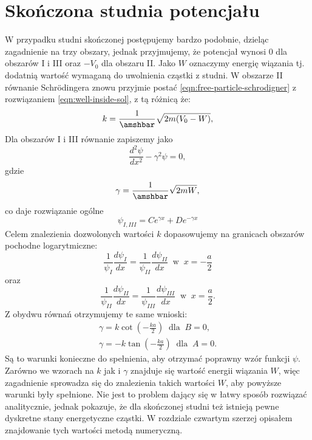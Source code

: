 \documentclass{SGGW-thesis}
\begin{document}
	\section{Skończona studnia potencjału}
	W przypadku studni skończonej postępujemy bardzo podobnie, dzieląc zagadnienie na trzy obszary, jednak przyjmujemy, że potencjał wynosi 0 dla obszarów I i III oraz $-V_0$ dla obszaru II. Jako $W$ oznaczymy energię wiązania tj. dodatnią wartość wymaganą do uwolnienia cząstki z studni. W obszarze II równanie Schrödingera znowu przyjmie postać \ref{eqn:free-particle-schrodigner} z rozwiązaniem \ref{eqn:well-inside-sol}, z tą różnicą że:
	\begin{equation}\label{eqn:k-fi-well}
	k=\frac{1}{\amshbar}\sqrt{2m(V_0-W)},
	\end{equation}
Dla obszarów I i III równanie zapiszemy jako
	\begin{equation}
	\frac{d^2\psi}{dx^2}-\gamma^2 \psi = 0,
	\end{equation}
gdzie
	\begin{equation}\label{eqn:gamma-fi-well}
	\gamma = \frac{1}{\amshbar}\sqrt{2mW},
	\end{equation}
co daje rozwiązanie ogólne
	\begin{equation}
	\psi_{I,III}= Ce^{\gamma x} + De^{-\gamma x}
	\end{equation}
Celem znalezienia dozwolonych wartości $k$ dopasowujemy na granicach obszarów pochodne logarytmiczne:
	\begin{equation}
	\frac{1}{\psi_I}\frac{d\psi_I}{dx} = \frac{1}{\psi_{II}}\frac{d\psi_{II}}{dx}
	\;\; \textrm{w}\;\; 
	x=-\frac{a}{2}
	\end{equation}
oraz
	\begin{equation}
	\frac{1}{\psi_{II}}\frac{d\psi_{II}}{dx} = \frac{1}{\psi_{III}}\frac{d\psi_{III}}{dx}
	\;\; \textrm{w} \;\;
	x=\frac{a}{2}.
	\end{equation}
Z obydwu równań otrzymujemy te same wnioski:
	\begin{equation}\label{eqn:fi-well-k-gamma}
	\begin{split}
	\gamma = k \cot\left(-\frac{ka}{2}\right)\;\; \textrm{dla} \;\; B = 0,\\
	\gamma = -k \tan\left(-\frac{ka}{2}\right)\;\; \textrm{dla} \;\; A = 0.
	\end{split}
	\end{equation}
Są to warunki konieczne do spełnienia, aby otrzymać poprawny wzór funkcji $\psi$.
Zarówno we wzorach na $k$ jak i $\gamma$ znajduje się wartość energii wiązania $W$, więc zagadnienie sprowadza się do znalezienia takich wartości $W$, aby powyższe warunki były spełnione. Nie jest to problem dający się w łatwy sposób rozwiązać analitycznie, jednak pokazuje, że dla skończonej studni też istnieją pewne dyskretne stany energetyczne cząstki. W rozdziale czwartym szerzej opisałem znajdowanie tych wartości metodą numeryczną.
\end{document}
